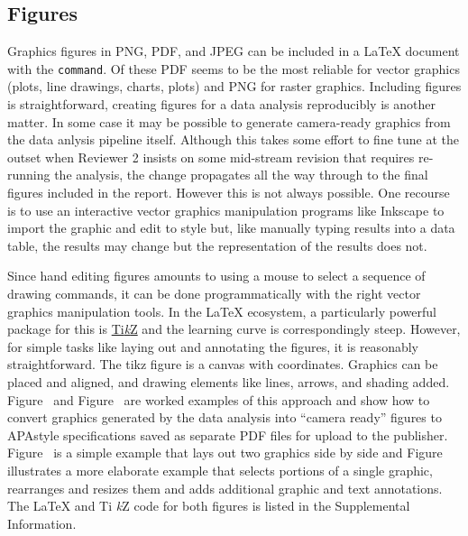 \documentclass[helv,10pt,man,floatsintext]{apa6}  %
\begin{document}
\subsection{Figures}

Graphics figures in PNG, PDF, and JPEG can be included in a \LaTeX{}
document with the \texttt{command}. Of these PDF seems to
be the most reliable for vector graphics (plots, line drawings,
charts, plots) and PNG for raster graphics.  Including figures is
straightforward, creating figures for a data analysis reproducibly is
another matter. In some case it may be possible to generate
camera-ready graphics from the data anlysis pipeline itself. Although
this takes some effort to fine tune at the outset when Reviewer 2
insists on some mid-stream revision that requires re-running the
analysis, the change propagates all the way through to the final
figures included in the report. However this is not always
possible. One recourse is to use an interactive vector graphics
manipulation programs like Inkscape to import the graphic and edit to
style but, like manually typing results into a data table, the results
may change but the representation of the results does not.

Since hand editing figures amounts to using a mouse to select a
sequence of drawing commands, it can be done programmatically with the
right vector graphics manipulation tools. In the LaTeX{} ecosystem, a
particularly powerful package for this is
\href{https://en.wikipedia.org/wiki/PGF/TikZ}{Ti{\it k}Z} and the
learning curve is correspondingly steep. However, for simple tasks
like laying out and annotating the figures, it is reasonably
straightforward. The tikz figure is a canvas with coordinates.
Graphics can be placed and aligned, and drawing elements like lines,
arrows, and shading added. Figure~ and
Figure~ are worked examples of this approach and show
how to convert graphics generated by the data analysis into ``camera
ready'' figures to APAstyle specifications saved as separate PDF files
for upload to the publisher.  Figure~ is a simple
example that lays out two graphics side by side and
Figure~ illustrates a more elaborate example that
selects portions of a single graphic, rearranges and resizes them and
adds additional graphic and text annotations. The \LaTeX{} and Ti{\it
  k}Z code for both figures is listed in the Supplemental Information.
\end{document}
